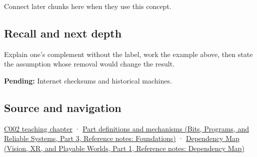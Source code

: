 \hypertarget{appendix-03c678cd40b3-used-by}{}

Connect later chunks here when they use this concept.

\subsection{Recall and next depth}\label{appendix-03c678cd40b3-recall-and-next-depth}

\hypertarget{appendix-03c678cd40b3-recall-and-next-depth}{}

Explain one's complement without the label, work the example above, then state the assumption whose removal would change the result.

\textbf{Pending:} Internet checksums and historical machines.

\subsection{Source and navigation}\label{appendix-03c678cd40b3-source-and-navigation}

\hypertarget{appendix-03c678cd40b3-source-and-navigation}{}

\hyperref[01-foundations-i-ch001-arithmetic-becomes-a-policy]{C002 teaching chapter} · \href{../01-Bits-Programs-and-Reliable-Systems-P03/main.pdf\#nameddest=appendix-fd090d982a15}{Part definitions and mechanisms (Bits, Programs, and Reliable Systems, Part 3, Reference notes: Foundations)} · \href{../07-Vision-XR-and-Playable-Worlds-P01/main.pdf\#nameddest=appendix-4ad47bdd269a}{Dependency Map (Vision, XR, and Playable Worlds, Part 1, Reference notes: Dependency Map)}
